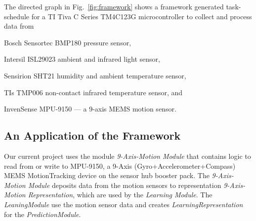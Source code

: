 \documentclass[]{IEEEtran}
\begin{document}
The directed graph in Fig.~\ref{fig:framework} shows a framework generated task-schedule for  a TI Tiva C Series TM4C123G microcontroller to collect and process data from \begin{inparaenum}[($i$)] \item Bosch Sensortec BMP180 pressure sensor, \item Intersil ISL29023 ambient and infrared light sensor, \item Sensirion SHT21 humidity and ambient temperature sensor,  \item  TIs TMP006 non-contact infrared temperature sensor, and \item InvenSense 
MPU-9150 --- a 9-axis MEMS motion sensor. \end{inparaenum}



\subsection{An Application of the Framework}

Our current project uses 
the module {\em 
9-Axis-Motion Module} that contains logic to read from or write to MPU-9150, a 9-Axis 
(Gyro+Accelerometer+Compass) MEMS MotionTracking device on the sensor hub booster pack. The {\em 
9-Axis-Motion Module} deposits data from the motion sensors to 
representation {\em 9-Axis-Motion Representation}, which are used by the {\em 
Learning Module}. The {\em LeaningModule} use the motion sensor data and creates {\em LearningRepresentation} for the {\em PredictionModule}. 
\end{document}
